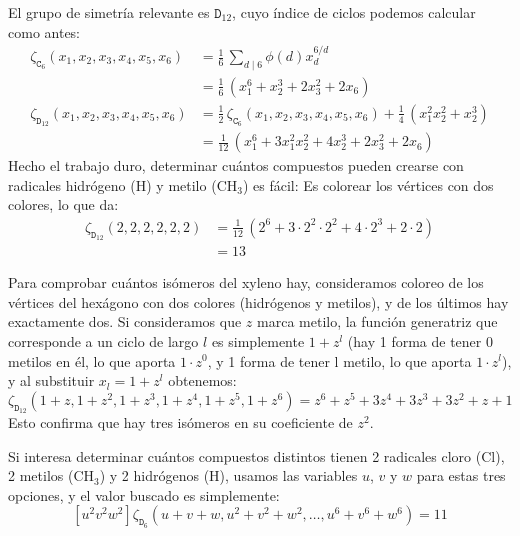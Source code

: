   El grupo de simetría relevante es \(\mathtt{D}_{12}\),
  cuyo índice de ciclos podemos calcular como antes:
  \begin{align*}
    \zeta_{\mathtt{C}_6} (x_1, x_2, x_3, x_4, x_5, x_6)
      &= \frac{1}{6} \, \sum_{d \mid 6} \phi(d) x_d^{6 / d} \\
      &= \frac{1}{6} \, \left(
			  x_1^6 + x_2^3 + 2 x_3^2 + 2 x_6
			\right) \\
    \zeta_{\mathtt{D}_{12}} (x_1, x_2, x_3, x_4, x_5, x_6)
      &= \frac{1}{2} \, \zeta_{\mathtt{C}_6}
			  (x_1, x_2, x_3, x_4, x_5, x_6)
	   + \frac{1}{4} \, \left(
			      x_1^2 x_2^2 + x_2^3
			    \right) \\
      &= \frac{1}{12} \, \left(
			   x_1^6 + 3 x_1^2 x_2^2
			     + 4 x_2^3 + 2 x_3^2 + 2 x_6
			 \right)
  \end{align*}
  Hecho el trabajo duro,
  determinar cuántos compuestos pueden crearse
  con radicales hidrógeno (\(\text{H}\))
  y metilo (\(\text{CH}_3\))
  es fácil:
  Es colorear los vértices con dos colores,
  lo que da:
  \begin{align*}
    \zeta_{\mathtt{D}_{12}}(2, 2, 2, 2, 2, 2)
      & = \frac{1}{12} \,
	     (2^6 + 3 \cdot 2^2 \cdot 2^2
		  + 4 \cdot 2^3 + 2 \cdot 2) \\
      & = 13
  \end{align*}

  Para comprobar cuántos isómeros del xyleno hay,
  consideramos coloreo de los vértices del hexágono con dos colores
  (hidrógenos y metilos),
  y de los últimos hay exactamente dos.
  Si consideramos que \(z\) marca metilo,
  la función generatriz que corresponde a un ciclo de largo \(l\)
  es simplemente \(1 + z^l\)
  (hay 1 forma de tener 0 metilos en él,
   lo que aporta \(1 \cdot z^0\),
   y 1 forma de tener l metilo,
   lo que aporta \(1 \cdot z^l\)),
  y al substituir \(x_l = 1 + z^l\) obtenemos:
  \begin{equation*}
    \zeta_{\mathtt{D}_{12}}(1 + z, 1 + z^2, 1 + z^3, 1 + z^4,
			    1 + z^5, 1 + z^6)
      = z^6 + z^5 + 3 z^4 + 3 z^3 + 3 z^2 + z + 1
  \end{equation*}
  Esto confirma que hay tres isómeros en su coeficiente de \(z^2\).

  Si interesa determinar cuántos compuestos distintos tienen
  2 radicales cloro (\(\text{Cl}\)),
  2 metilos (\(\text{CH}_3\))
  y 2 hidrógenos  (\(\text{H}\)),
  usamos las variables \(u\), \(v\) y \(w\)
  para estas tres opciones,
  y el valor buscado es simplemente:
  \begin{equation*}
    \left[ u^2 v^2 w^2 \right]
      \zeta_{\mathtt{D}_6} (u + v + w,
			    u^2 + v^2 + w^2,
			    \dotsc,
			    u^6 + v^6 + w^6)
	 = 11
  \end{equation*}

